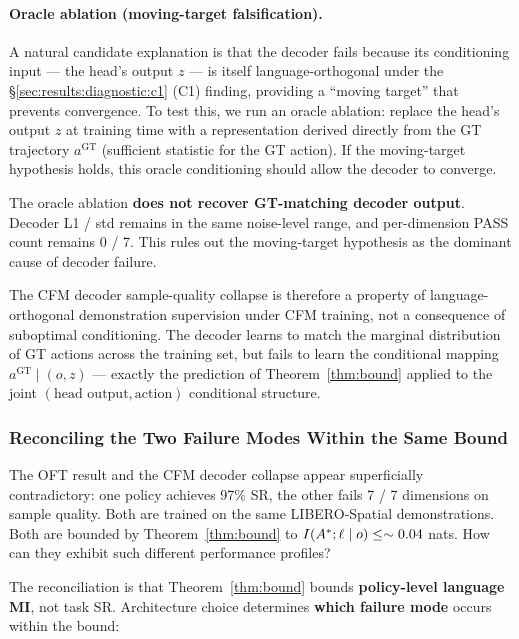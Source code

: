 \paragraph{Oracle ablation (moving-target falsification).}
A natural candidate explanation is that the decoder fails because its conditioning
input --- the head's output $z$ --- is itself language-orthogonal under the
\S\ref{sec:results:diagnostic:c1} (C1) finding, providing a ``moving target'' that
prevents convergence. To test this, we run an oracle ablation: replace the head's
output $z$ at training time with a representation derived directly from the GT
trajectory $a^{\text{GT}}$ (sufficient statistic for the GT action). If the
moving-target hypothesis holds, this oracle conditioning should allow the decoder to
converge.

The oracle ablation \textbf{does not recover GT-matching decoder output}. Decoder L1 /
std remains in the same noise-level range, and per-dimension PASS count remains 0 / 7.
This rules out the moving-target hypothesis as the dominant cause of decoder failure.

The CFM decoder sample-quality collapse is therefore a property of language-orthogonal
demonstration supervision under CFM training, not a consequence of suboptimal
conditioning. The decoder learns to match the marginal distribution of GT actions across
the training set, but fails to learn the conditional mapping $a^{\text{GT}} \mid (o, z)$
--- exactly the prediction of Theorem~\ref{thm:bound} applied to the joint
$(\text{head output}, \text{action})$ conditional structure.

\subsubsection{Reconciling the Two Failure Modes Within the Same Bound}
\label{sec:results:cfm_collapse:reconcile}

The OFT result and the CFM decoder collapse appear superficially contradictory: one
policy achieves 97\% SR, the other fails 7 / 7 dimensions on sample quality. Both are
trained on the same LIBERO-Spatial demonstrations. Both are bounded by
Theorem~\ref{thm:bound} to $I(A^{*}; \ell \mid o) \le \sim 0.04$ nats. How can they
exhibit such different performance profiles?

The reconciliation is that Theorem~\ref{thm:bound} bounds \textbf{policy-level language
MI}, not task SR. Architecture choice determines \textbf{which failure mode} occurs
within the bound:

